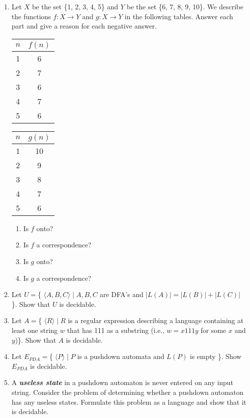\documentclass{article}
\begin{document}
\begin{enumerate}
        \item Let $X$ be the set \{1, 2, 3, 4, 5\} and $Y$ be the set \{6, 7, 8, 9, 10\}. 
        We describe the functions $f : X\rightarrow Y$ and $g : X \rightarrow Y$ in the 
        following tables. Answer each part and give a reason for each negative answer.
        \begin{center}
            \begin{tabular}{c|c}
                $n$ & $f(n)$\\
                \hline
                1 & 6\\
                2 & 7\\
                3 & 6\\
                4 & 7\\
                5 & 6
            \end{tabular}
            \quad
            \begin{tabular}{c | c}
                $n$ & $g(n)$\\
                \hline
                1 & 10\\
                2 & 9\\
                3 & 8\\
                4 & 7\\
                5 & 6
            \end{tabular}
        \end{center}
        \begin{enumerate}
            \item Is $f$ onto?
            \item Is $f$ a correspondence?
            \item Is $g$ onto?
            \item Is $g$ a correspondence?
        \end{enumerate}

        \item Let $U = $\{ $\langle A, B, C \rangle \mid A, B, C$ are DFA's and $|L(A)| = 
        |L(B)| + |L(C)|$ \}. Show that $U$ is decidable.

        \item Let $A = $\{ $\langle R \rangle \mid R$ is a regular expression describing a 
        language containing at least one string $w$ that has 111 as a substring (i.e., 
        $w = x111y$ for some $x$ and $y$)\}. Show that $A$ is decidable.
        
        \item Let $E_{PDA} = $\{ $\langle P \rangle \mid P$ is a pushdown automata and 
        $L(P)$ is empty \}. Show $E_{PDA}$ is decidable.

        \item A \textbf{\textit{useless state}} in a pushdown automaton is never entered 
        on any input string. Consider the problem of determining whether a pushdown 
        automaton has any useless states. Formulate this problem as a language and show 
        that it is decidable.
    \end{enumerate}
\end{document}
